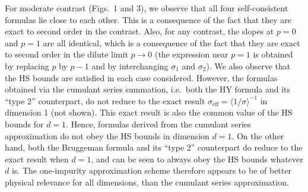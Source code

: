 For moderate contrast (Figs.\ 1 and 3), we observe that all four
self-consistent formulas lie close to each other. This is a
consequence of the fact that they are exact to second order in the
contrast. Also, for any contrast, the slopes at $p=0$ and $p=1$ are
all identical, which is a consequence of the fact that they are exact
to second order in the dilute limit $p\to 0$ (the expression near
$p=1$ is obtained by replacing $p$ by $p-1$ and by interchanging
$\sigma_1$ and $\sigma_2$). We also observe that the HS bounds are
satisfied in each case considered. However, the formulas obtained via
the cumulant series summation, i.e.\ both the HY formula and its
``type 2'' counterpart, do not reduce to the exact result
$\sigma_{\text{eff}}=\langle 1/\sigma\rangle^{-1}$ in dimension 1 (not
shown). This exact result is also the common value of the HS bounds
for $d=1$. Hence, formulas derived from the cumulant series
approximation do not obey the HS bounds in dimension $d=1$. On the
other hand, both the Bruggeman formula and its ``type 2'' counterpart
do reduce to the exact result when $d=1$, and can be seen to always
obey the HS bounds whatever $d$ is. The one-impurity approximation
scheme therefore appears to be of better physical relevance for all
dimensions, than the cumulant series approximation.

